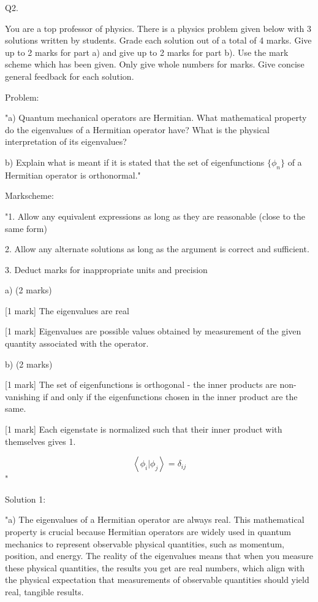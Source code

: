                            Q2. 

You are a top professor of physics. There is a physics problem given below with 3 solutions written by students. Grade each solution out of a total of 4 marks. Give up to 2 marks for part a) and give up to 2 marks for part b). Use the mark scheme which has been given. Only give whole numbers for marks. Give concise general feedback for each solution. 

Problem: 

"a) Quantum mechanical operators are Hermitian. What mathematical property do the eigenvalues of a Hermitian operator have? What is the physical interpretation of its eigenvalues?

b) Explain what is meant if it is stated that the set of eigenfunctions \( \{\phi_{n}\} \) of a Hermitian operator is orthonormal."

Markscheme:

"1. Allow any equivalent expressions as long as they are reasonable (close to the same form)

2. Allow any alternate solutions as long as the argument is correct and sufficient. 

3. Deduct marks for inappropriate units and precision

a) (2 marks)

[1 mark] The eigenvalues are real 

[1 mark] Eigenvalues are possible values obtained by measurement of the given quantity associated with the operator. 

b) (2 marks)

[1 mark] The set of eigenfunctions is orthogonal - the inner products are non-vanishing if and only if the eigenfunctions chosen in the inner product are the same. 

[1 mark] Each eigenstate is normalized such that their inner product with themselves gives 1. 

\[ \left< \phi_i | \phi_j \right> = \delta_{ij} \]
"

Solution 1: 

"a) The eigenvalues of a Hermitian operator are always real. This mathematical property is crucial because Hermitian operators are widely used in quantum mechanics to represent observable physical quantities, such as momentum, position, and energy. The reality of the eigenvalues means that when you measure these physical quantities, the results you get are real numbers, which align with the physical expectation that measurements of observable quantities should yield real, tangible results.

